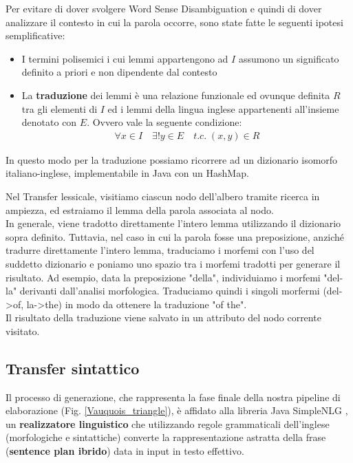 Per evitare di dover svolgere Word Sense Disambiguation e quindi di dover analizzare il contesto in cui la parola occorre, sono state fatte le seguenti ipotesi semplificative:
\begin{itemize}
	\item I termini polisemici i cui lemmi appartengono ad $I$ assumono un significato definito a priori e non dipendente dal contesto 
	\item La \textbf{traduzione} dei lemmi è una relazione funzionale ed ovunque definita $R$  tra gli elementi di $I$ ed i lemmi della lingua inglese appartenenti all'insieme denotato con $E$. Ovvero vale la seguente condizione:
	\begin{align*}
		\forall x \in I \quad  \exists! y \in E \quad t.c. \; (x,y) \in R 
	\end{align*}
\end{itemize}
In questo modo per la traduzione possiamo ricorrere ad un dizionario isomorfo italiano-inglese, implementabile in Java con un HashMap.
	  
Nel Transfer lessicale, visitiamo ciascun nodo dell'albero tramite ricerca in ampiezza, ed estraiamo il lemma della parola associata al nodo. \\
In generale, viene tradotto direttamente l'intero lemma utilizzando il dizionario sopra definito.
Tuttavia, nel caso in cui la parola fosse una preposizione, anziché tradurre direttamente l'intero lemma, traduciamo i morfemi con l'uso del suddetto dizionario e poniamo uno spazio tra i morfemi tradotti per generare il risultato.
Ad esempio, data la preposizione "della", individuiamo i morfemi "del-la" derivanti dall'analisi morfologica. Traduciamo quindi i singoli morfermi (del->of, la->the) in modo da ottenere la traduzione "of the". \\
Il risultato della traduzione viene salvato in un attributo del nodo corrente visitato.
\subsection{Transfer sintattico}
\label{sec:transfer_sintattico}
Il processo di generazione, che rappresenta la fase finale della nostra pipeline di elaborazione (Fig. \ref{Vauquois_triangle}), è affidato alla libreria Java SimpleNLG \cite{simpleNLG}, un \textbf{realizzatore linguistico} che utilizzando regole grammaticali dell'inglese (morfologiche e sintattiche) converte la rappresentazione astratta della frase (\textbf{sentence plan ibrido}) data in input in testo effettivo. \\

